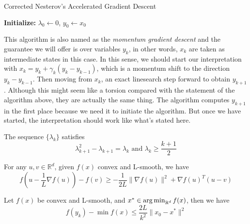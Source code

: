 \begin{minipage}{0.8\textwidth}  %
    \centering
    \begin{algorithm}[H]
        \caption{Corrected Nesterov's Accelerated Gradient Descent}\label{algo:NesterovAcceleratedGD}
    
        \textbf{Initialize:} $\lambda_0 \gets 0$, $y_0 \gets x_0$\;
    
    \end{algorithm}
    \vspace{2em}
\end{minipage}

\par

This algorithm is also named as the \emph{momentum gradient descent} and the guarantee we will offer is over variables $y_k$, in other words, $x_k$ are taken as intermediate states in this case. In this sense, we should start our interpretation with $x_{k} = y_{k} + \gamma_k (y_{k} - y_{k-1})$, which is a momentum shift to the direction $y_{k} - y_{k-1}$. Then moving from $x_{k}$, an exact linesearch step forward to obtain $y_{k+1}$. Although this might seem like a torsion compared with the statement of the algorithm above, they are actually the same thing. The algorithm computes $y_{k+1}$ in the first place because we need it to initiate the algorithm. But once we have started, the interpretation should work like what's stated here. 

\begin{lemma}
    The sequence $\{\lambda_k\}$ satisfies
    \begin{equation*}
        \lambda_{k+1}^2 - \lambda_{k+1} = \lambda_k \text{ and } \lambda_k \geq \frac{k+1}{2}
    \end{equation*}
\end{lemma}

\begin{lemma}
    For any $u, v \in \mathbb{R}^d$, given $f(x)$ convex and L-smooth, we have 
    \begin{equation*}
        f(u - \frac{1}{L}\nabla f(u)) - f(v) \geq - \frac{1}{2L} \| \nabla f(u) \|^2 + \nabla f(u)^T(u-v)
    \end{equation*}
\end{lemma}

\begin{theorem}
    Let $f(x)$ be convex and L-smooth, and $x^* \in \operatorname*{arg\,min}_{\mathbb{R}^d} f(x)$, then we have
    \begin{equation*}
        f(y_k) - \min f(x) \leq \frac{2L}{k^2} \| x_0 - x^* \|^2
    \end{equation*}
\end{theorem}
